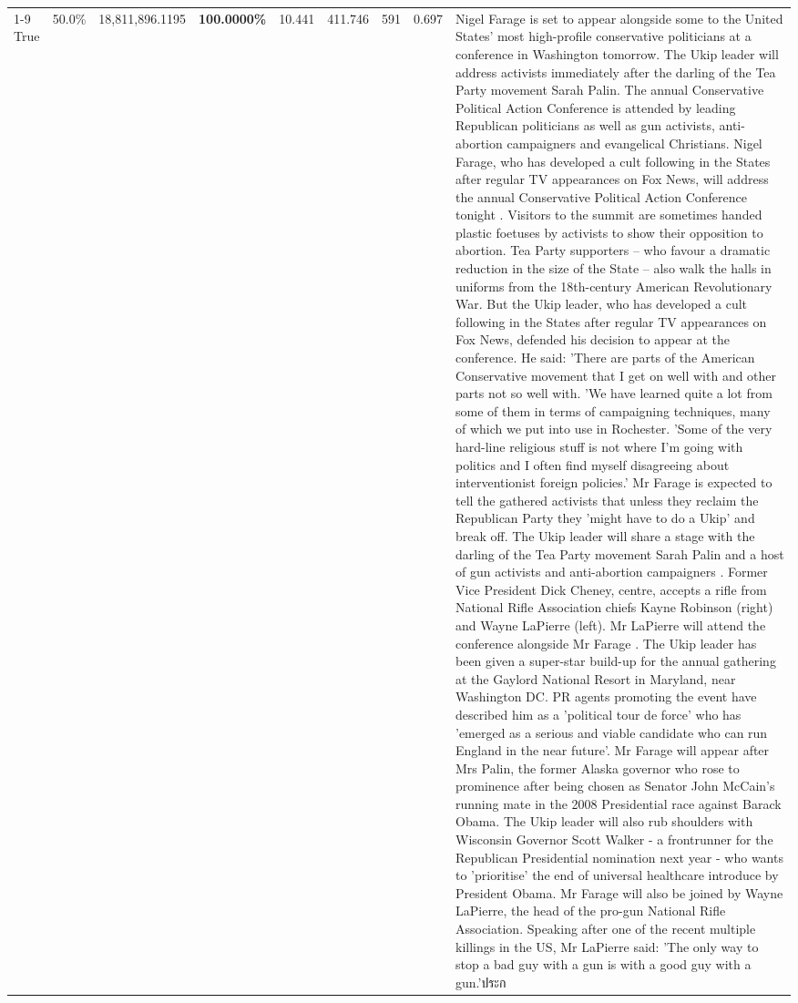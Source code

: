 \begin{table}[H]
\begin{tabular}{lllrlllll}
\cline{1-9}
True & 50.0\% & 18,811,896.1195 & \bfseries \color{red} 100.0000\% & 10.441 & 411.746 & 591 & 0.697 & Nigel Farage is set to appear alongside some to the United States' most high-profile conservative politicians at a conference in Washington tomorrow. The Ukip leader will address activists immediately after the darling of the Tea Party movement Sarah Palin. The annual Conservative Political Action Conference is attended by leading Republican politicians as well as gun activists, anti-abortion campaigners and evangelical Christians. Nigel Farage, who has developed a cult following in the States after regular TV appearances on Fox News, will address the annual Conservative Political Action Conference tonight . Visitors to the summit are sometimes handed plastic foetuses by activists to show their opposition to abortion. Tea Party supporters – who favour a dramatic reduction in the size of the State – also walk the halls in uniforms from the 18th-century American Revolutionary War. But the Ukip leader, who has developed a cult following in the States after regular TV appearances on Fox News, defended his decision to appear at the conference. He said: 'There are parts of the American Conservative movement that I get on well with and other parts not so well with. 'We have learned quite a lot from some of them in terms of campaigning techniques, many of which we put into use in Rochester. 'Some of the very hard-line religious stuff is not where I'm going with politics and I often find myself disagreeing about interventionist foreign policies.' Mr Farage is expected to tell the gathered activists that unless they reclaim the Republican Party they 'might have to do a Ukip' and break off. The Ukip leader will share a stage with the darling of the Tea Party movement Sarah Palin and a host of gun activists and anti-abortion campaigners . Former Vice President Dick Cheney, centre, accepts a rifle from National Rifle Association chiefs Kayne Robinson (right) and Wayne LaPierre (left). Mr LaPierre will attend the conference alongside Mr Farage . The Ukip leader has been given a super-star build-up for the annual gathering at the Gaylord National Resort in Maryland, near Washington DC. PR agents promoting the event have described him as a 'political tour de force' who has 'emerged as a serious and viable candidate who can run England in the near future'. Mr Farage will appear after Mrs Palin, the former Alaska governor who rose to prominence after being chosen as Senator John McCain's running mate in the 2008 Presidential race against Barack Obama. The Ukip leader will also rub shoulders with Wisconsin Governor Scott Walker - a frontrunner for the Republican Presidential nomination next year - who wants to 'prioritise' the end of universal healthcare introduce by President Obama. Mr Farage will also be joined by Wayne LaPierre, the head of the pro-gun National Rifle Association. Speaking after one of the recent multiple killings in the US, Mr LaPierre said: 'The only way to stop a bad guy with a gun is with a good guy with a gun.'ประก \\

\end{tabular}
\end{table}
